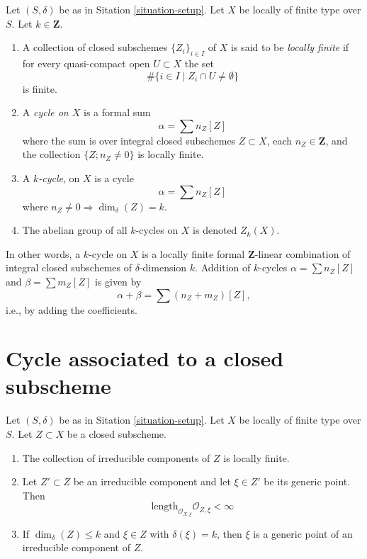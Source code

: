 \begin{definition}
\label{definition-cycles}
Let $(S, \delta)$ be as in Sitation \ref{situation-setup}.
Let $X$ be locally of finite type over $S$.
Let $k \in \mathbf{Z}$.
\begin{enumerate}
\item A collection of closed subschemes $\{Z_i\}_{i \in I}$ of $X$
is said to be {\it locally finite} if for every quasi-compact open
$U \subset X$ the set
$$
\# \{i\in I \mid Z_i \cap U \not = \emptyset\}
$$
is finite.
\item A {\it cycle on $X$} is a formal sum
$$
\alpha = \sum n_Z [Z]
$$
where the sum is over integral closed subschemes $Z \subset X$,
each $n_Z \in \mathbf{Z}$, and the collection
$\{Z; n_Z \not = 0\}$ is locally finite.
\item A {\it $k$-cycle}, on $X$ is
a cycle
$$
\alpha = \sum n_Z [Z]
$$
where $n_Z \not = 0 \Rightarrow \dim_\delta(Z) = k$.
\item The abelian group of all $k$-cycles on $X$ is denoted $Z_k(X)$.
\end{enumerate}
\end{definition}

\noindent
In other words, a $k$-cycle on $X$
is a locally finite formal $\mathbf{Z}$-linear
combination of integral closed subschemes of $\delta$-dimension $k$.
Addition of $k$-cycles $\alpha = \sum n_Z[Z]$ and 
$\beta = \sum m_Z[Z]$ is given by
$$
\alpha + \beta = \sum (n_Z + m_Z)[Z],
$$
i.e., by adding the coefficients.




\section{Cycle associated to a closed subscheme}
\label{section-cycle-of-closed-subscheme}

\begin{lemma}
\label{lemma-multiplicity-finite}
Let $(S, \delta)$ be as in Sitation \ref{situation-setup}.
Let $X$ be locally of finite type over $S$.
Let $Z \subset X$ be a closed subscheme.
\begin{enumerate}
\item The collection of irreducible components of $Z$
is locally finite.
\item Let $Z' \subset Z$ be an irreducible component and
let $\xi \in Z'$ be its generic point.
Then
$$
\text{length}_{\mathcal{O}_{X, \xi}} \mathcal{O}_{Z, \xi} < \infty
$$
\item If $\dim_\delta(Z) \leq k$ and $\xi \in Z$ with
$\delta(\xi) = k$, then $\xi$ is a generic point of an
irreducible component of $Z$.
\end{enumerate}
\end{lemma}

